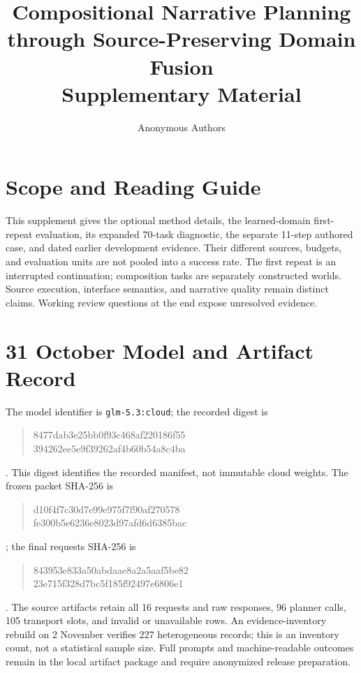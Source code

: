 \documentclass[letterpaper]{article}
\title{Compositional Narrative Planning through Source-Preserving Domain Fusion\\Supplementary Material}
\author{Anonymous Authors}
\begin{document}
\maketitle
\section{Scope and Reading Guide}
This supplement gives the optional method details, the learned-domain first-repeat evaluation, its expanded 70-task diagnostic, the separate 11-step authored case, and dated earlier development evidence. Their different sources, budgets, and evaluation units are not pooled into a success rate. The first repeat is an interrupted continuation; composition tasks are separately constructed worlds. Source execution, interface semantics, and narrative quality remain distinct claims. Working review questions at the end expose unresolved evidence.








\section{31 October Model and Artifact Record}
The model identifier is \texttt{glm-5.3:cloud}; the recorded digest is

\begin{quote}\ttfamily
8477dab3e25bb0f93c468af220186f55\\
394262ee5e9f39262af4b60b54a8c4ba
\end{quote}.
This digest identifies the recorded manifest, not immutable cloud weights.
The frozen packet SHA-256 is

\begin{quote}\ttfamily
d10f4f7c30d7e99e975f7f90af270578\\
fe300b5e6236e8023d97afd6d6385bac
\end{quote};
the final requests SHA-256 is

\begin{quote}\ttfamily
843953e833a50abdaae8a2a5aaf5be82\\
23e715f328d7bc5f185f92497e6806e1
\end{quote}.
The source artifacts retain all 16 requests and raw responses, 96 planner calls, 105 transport slots, and invalid or unavailable rows. An evidence-inventory rebuild on 2 November verifies 227 heterogeneous records; this is an inventory count, not a statistical sample size. Full prompts and machine-readable outcomes remain in the local artifact package and require anonymized release preparation.
\end{document}
